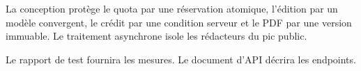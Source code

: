 La conception protège le quota par une réservation atomique, l'édition par un modèle convergent, le crédit par une condition serveur et le PDF par une version immuable. Le traitement asynchrone isole les rédacteurs du pic public.


Le rapport de test fournira les mesures. Le document d'API décrira les endpoints.
